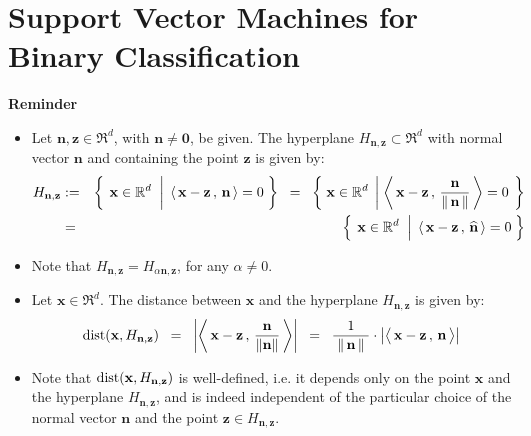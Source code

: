 
\section{Support Vector Machines for Binary Classification}
\setcounter{theorem}{0}

\vskip 0.3cm
\noindent
\textbf{Reminder}
\begin{itemize}
\item  Let $\mathbf{n}, \mathbf{z} \in \Re^{d}$, with $\mathbf{n} \neq \mathbf{0}$, be given.
          The hyperplane $H_{\mathbf{n},\mathbf{z}} \subset \Re^{d}$ with normal vector $\mathbf{n}$ and
          containing the point $\mathbf{z}$ is given by: 
          \begin{eqnarray*}
          H_{\mathbf{n},\mathbf{z}}
          & := &
          \left\{\;
          	\left.
          	\mathbf{x}\overset{{\color{white}1}}{\in}\Re^{d}
		\;\;\right\vert\;
			\left\langle\,\mathbf{x}-\mathbf{z}\,,\,\mathbf{n}\,\right\rangle = 0
			\;\right\}
	\;\; = \;\;
	\left\{\;
		\mathbf{x}\in\Re^{d}
		\;\left\vert\;
			\left\langle\,\mathbf{x}-\mathbf{z}\,,\,\frac{\mathbf{n}}{\Vert\,\mathbf{n}\,\Vert}\,\right\rangle = 0
			\right.\;\right\}
	\\
	& = &
	\left\{\;
		\left.
		\mathbf{x}\overset{{\color{white}.}}{\in}\Re^{d}
		\;\;\right\vert\;
			\left\langle\,\mathbf{x}-\mathbf{z}\,,\,\widehat{\mathbf{n}}\,\right\rangle = 0
		\;\right\}
	\end{eqnarray*}
	
\item
	Note that $H_{\mathbf{n},\mathbf{z}} = H_{\alpha\mathbf{n},\mathbf{z}}$, for any $\alpha \neq 0$.
\item
	Let $\mathbf{x} \in \Re^{d}$.  The distance between $\mathbf{x}$ and the hyperplane $H_{\mathbf{n},\mathbf{z}}$
	is given by:
	\begin{equation*}
	\dist\!\left(\mathbf{x},H_{\mathbf{n},\mathbf{z}}\right)
	\;\; = \;\;
		\left\vert
		\left\langle\,\mathbf{x}-\mathbf{z}\,,\,\dfrac{\mathbf{n}}{\Vert\mathbf{n}\Vert}\,\right\rangle
		\right\vert
	\;\; = \;\;
		\dfrac{1}{{\color{white}.}\Vert\,\mathbf{n}\,\Vert{\color{white}.}}
		\cdot
		\left\vert
		\left\langle\,\mathbf{x}-\mathbf{z}\,,\,\overset{{\color{white}.}}{\mathbf{n}}\,\right\rangle
		\right\vert
	\end{equation*}
\item
	Note that
	$\textnormal{dist}\!\left(\mathbf{x},H_{\mathbf{n},\mathbf{z}}\right)$ is well-defined,
	i.e. it depends only on the point $\mathbf{x}$ and the hyperplane
	$H_{\mathbf{n},\mathbf{z}}$, and is indeed independent of the particular choice
	of the normal vector $\mathbf{n}$ and the point
	$\mathbf{z} \in H_{\mathbf{n},\mathbf{z}}$. 
\end{itemize}

